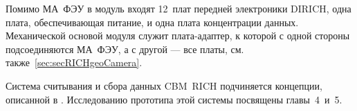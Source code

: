 
Помимо МА~ФЭУ в модуль входят 12~плат передней электроники DIRICH, одна плата, обеспечивающая питание, и одна плата концентрации данных. Механической основой модуля служит плата-адаптер, к которой с одной стороны подсоединяются МА~ФЭУ, а с другой --- все платы, см. также~\ref{sec:secRICHgeoCamera}. 



Система считывания и сбора данных CBM~RICH подчиняется концепции, описанной в \todo. Исследованию прототипа этой системы посвящены главы~4~и~5.




